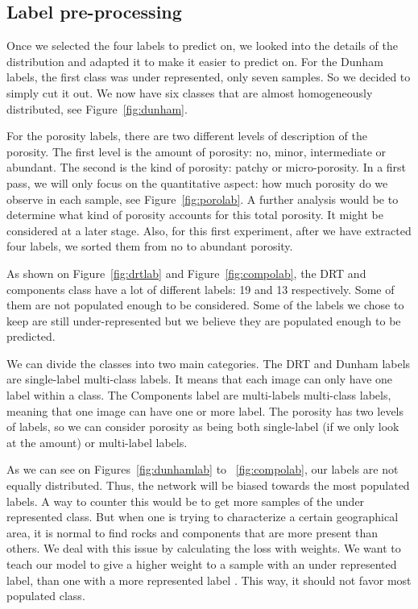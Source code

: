 \subsection{Label pre-processing}
Once we selected the four labels to predict on, we looked into the details of the distribution and adapted it to make it easier to predict on. For the Dunham labels, the first class was under represented, only seven samples. So we decided to simply cut it out. We now have six classes that are almost homogeneously distributed, see Figure~\ref{fig:dunham}. 

For the porosity labels, there are two different levels of description of the porosity. The first level is the amount of porosity: no, minor, intermediate or abundant. The second is the kind of porosity: patchy or micro-porosity. In a first pass, we will only focus on the quantitative aspect: how much porosity do we observe in each sample, see Figure~\ref{fig:porolab}. A further analysis would be to determine what kind of porosity accounts for this total porosity. It might be considered at a later stage. Also, for this first experiment, after we have extracted four labels, we sorted them from no to abundant porosity. 

As shown on Figure~\ref{fig:drtlab} and Figure~\ref{fig:compolab}, the DRT and components class have a lot of different labels: 19 and 13 respectively. Some of them are not populated enough to be considered. Some of the labels we chose to keep are still under-represented but we believe they are populated enough to be predicted.

We can divide the classes into two main categories. The DRT and Dunham labels are single-label multi-class labels. It means that each image can only have one label within a class. The Components label are multi-labels multi-class labels, meaning that one image can have one or more label. The porosity has two levels of labels, so we can consider porosity as being both single-label (if we only look at the amount) or multi-label labels. 


As we can see on Figures~\ref{fig:dunhamlab} to ~\ref{fig:compolab}, our labels are not equally distributed. Thus, the network will be biased towards the most populated labels. A way to counter this would be to get more samples of the under represented class. But when one is trying to characterize a certain geographical area, it is normal to find rocks and components that are more present than others. We deal with this issue by calculating the loss with weights. We want to teach our model to give a higher weight to a sample with an under represented label, than one with a more represented label . This way, it should not favor most populated class. 

